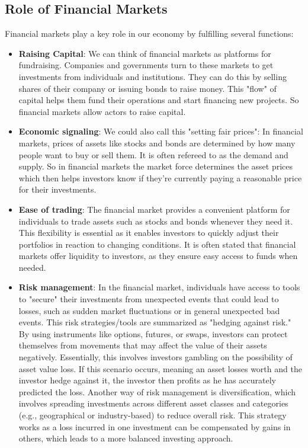 \documentclass{article}
\begin{document}
\subsection{Role of Financial Markets} 
Financial markets play a key role in our economy by fulfilling several functions:
\begin{itemize}
    \item \textbf{Raising Capital}:
    We can think of financial markets as platforms for fundraising. Companies and governments turn to these markets to get investments from individuals and institutions. They can do this by selling shares of their company or issuing bonds to raise money. This "flow" of capital helps them fund their operations and start financing  new projects. So financial markets allow actors to raise capital.
    
    \item \textbf{Economic signaling}: We could also call this "setting fair prices": In financial markets, prices of assets like stocks and bonds are determined by how many people want to buy or sell them. It is often refereed to as the demand and supply. So in financial markets the market force determines the asset prices which then helps investors know if they're currently paying a reasonable price for their investments.
    
    \item \textbf{Ease of trading}: The financial market provides a convenient platform for individuals to trade assets such as stocks and bonds whenever they need it. This flexibility is essential as it enables investors to quickly adjust their portfolios in reaction to changing conditions. It is often stated that financial markets offer liquidity to investors, as they ensure easy access to funds when needed.
    
    \item \textbf{Risk management}: In the financial market, individuals have access to tools to "secure" their investments from unexpected events that could lead to losses, such as sudden market fluctuations or in general unexpected bad events. This risk strategies/tools are summarized as "hedging against risk." By using instruments like options, futures, or swaps, investors can protect themselves from  movements that may affect the value of their assets negatively. Essentially, this involves investors gambling on the possibility of asset value loss. If this scenario occurs, meaning an asset losses worth and the investor hedge against it, the investor then profits as he has accurately predicted the loss. Another way of risk management is diversification, which involves spreading investments across different asset classes and categories (e.g., geographical or industry-based) to reduce overall risk. This strategy works as a loss incurred in one investment can be compensated by gains in others, which leads to a more balanced investing approach.
    

\end{itemize}
\end{document}

